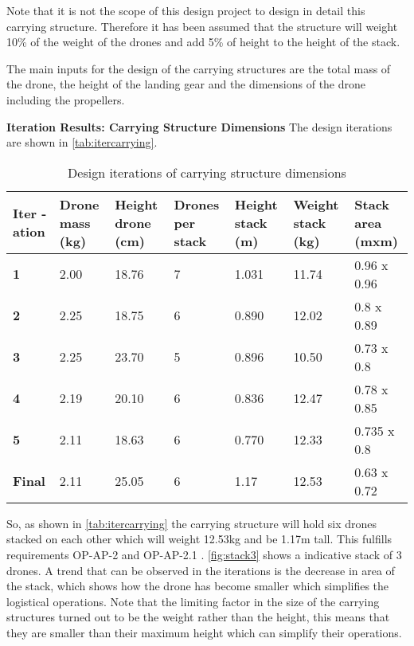 Note that it is not the scope of this design project to design in detail this carrying structure. Therefore it has been assumed that the structure will weight 10\% of the weight of the drones and add 5\% of height to the height of the stack. 


The main inputs for the design of the carrying structures are the total mass of the drone, the height of the landing gear and the dimensions of the drone including the propellers. 

\textbf{Iteration Results: Carrying Structure Dimensions} \newline
The design iterations are shown in \autoref{tab:itercarrying}. 

\begin{longtable}[h]{|p{1cm}|p{1.5cm}|p{1.9cm}|p{2cm}|p{2cm}|p{2cm}|p{2cm}|}
\caption{Design iterations of carrying structure dimensions}
\label{tab:itercarrying}\\
\hline
\textbf{Iter -ation} & \textbf{Drone mass (kg)} & \textbf{Height drone (cm)} & \textbf{Drones per stack} & \textbf{Height stack (m)} & \textbf{Weight stack (kg)} & \textbf{Stack area (mxm)} \\ \hline
\endfirsthead
%
\endhead
%
\textbf{1} & 2.00 & 18.76 & 7 & 1.031 & 11.74 & 0.96 x 0.96 \\ \hline
\textbf{2} & 2.25 & 18.75 & 6 & 0.890 & 12.02 & 0.8 x 0.89 \\ \hline
\textbf{3} & 2.25 & 23.70 & 5 & 0.896 & 10.50 & 0.73 x 0.8 \\ \hline
\textbf{4} & 2.19 & 20.10 & 6 & 0.836 & 12.47 & 0.78 x 0.85 \\ \hline
\textbf{5} & 2.11 & 18.63 & 6 & 0.770 & 12.33 & 0.735 x 0.8 \\ \hline
\rowcolor[HTML]{DDEBF7} 
\textbf{Final} & 2.11 & 25.05 & 6 & 1.17 & 12.53 & 0.63 x 0.72 \\ \hline
\end{longtable}

So, as shown in \autoref{tab:itercarrying} the carrying structure will hold six drones stacked on each other which will weight 12.53kg and be 1.17m tall. This fulfills requirements OP-AP-2 \label{req:OP-AP-2} and OP-AP-2.1 \label{req:OP-AP-2.1}. \autoref{fig:stack3} shows a indicative stack of 3 drones. A trend that can be observed in the iterations is the decrease in area of the stack, which shows how the drone has become smaller which simplifies the logistical operations. Note that the limiting factor in the size of the carrying structures turned out to be the weight rather than the height, this means that they are smaller than their maximum height which can simplify their operations.

